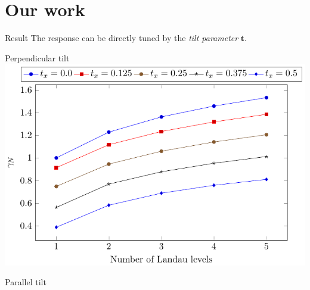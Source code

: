 \documentclass{beamer}
\renewcommand\vec\bm
\begin{document}
\section{Our work}
\begin{frame}[standout]
  \begin{block}{Result}
    The response can be directly tuned by the \emph{tilt parameter} \( \vec{t} \).
  \end{block}
\end{frame}
\begin{frame}{Perpendicular tilt}
  \centering
  \includegraphics[width=.7\textwidth]{contribtx}
\end{frame}
\begin{frame}{Parallel tilt}
  \begin{figure}
  \end{figure}
\end{frame}
\end{document}
